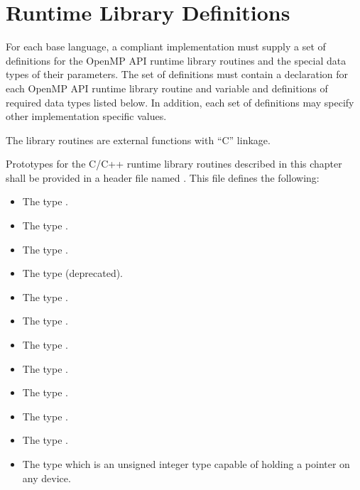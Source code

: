 \section{Runtime Library Definitions}
\label{sec:runtime library definitions}
For each base language, a compliant implementation must supply a set of definitions for
the OpenMP API runtime library routines and the special data types of their parameters.
The set of definitions must contain a declaration for each OpenMP API runtime library
routine and variable and definitions of required data types listed below. In addition,
each set of definitions may specify other implementation specific values.

\begin{ccppspecific}
The library routines are external functions with ``C'' linkage.

Prototypes for the C/C++ runtime library routines described in this chapter shall be
provided in a header file named . This file defines the following:

\begin{itemize}
\item The type .

\item The type .

\item The type .

\item The type  (deprecated).

\item The type .

\item The type .

\item The type .

\item The type .

\item The type .

\item The type .

\item The type .

\item The type  which is an unsigned integer type capable of
  holding a pointer on any device.


\end{itemize}
\end{ccppspecific}
